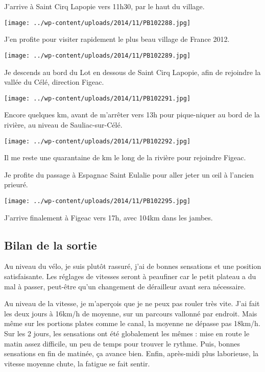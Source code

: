 J'arrive à Saint Cirq Lapopie vers 11h30, par le haut du village.
\begin{center} \texttt{[image: ../wp-content/uploads/2014/11/PB102288.jpg]} \end{center}

 J'en profite pour visiter rapidement le plus beau village de France 2012.
\begin{center} \texttt{[image: ../wp-content/uploads/2014/11/PB102289.jpg]} \end{center}
\vspace{-\topsep}

\pagebreak
 Je descends au bord du Lot en dessous de Saint Cirq Lapopie, afin de rejoindre la vallée du Célé, direction Figeac.
\begin{center} \texttt{[image: ../wp-content/uploads/2014/11/PB102291.jpg]} \end{center}

 Encore quelques km, avant de m'arrêter vers 13h pour pique-niquer au bord de la rivière, au niveau de Sauliac-sur-Célé.
\begin{center} \texttt{[image: ../wp-content/uploads/2014/11/PB102292.jpg]} \end{center}

 Il me reste une quarantaine de km le long de la rivière pour rejoindre Figeac.
 
 Je profite du passage à Espagnac Saint Eulalie pour aller jeter un œil à l'ancien prieuré.
\begin{center} \texttt{[image: ../wp-content/uploads/2014/11/PB102295.jpg]} \end{center}

 J'arrive finalement à Figeac vers 17h, avec 104km dans les jambes.
 
\subsection*{Bilan de la sortie}

 Au niveau du vélo, je suis plutôt rassuré, j'ai de bonnes sensations et une position satisfaisante. Les réglages de vitesses seront à peaufiner car le petit plateau a du mal à passer, peut-être qu'un changement de dérailleur avant sera nécessaire.

 Au niveau de la vitesse, je m'aperçois que je ne peux pas rouler très vite. J'ai fait les deux jours à 16km/h de moyenne, sur un parcours vallonné par endroit. Mais même sur les portions plates comme le canal, la moyenne ne dépasse pas 18km/h. Sur les 2 jours, les sensations ont été globalement les mêmes : mise en route le matin assez difficile, un peu de temps pour trouver le rythme. Puis, bonnes sensations en fin de matinée, ça avance bien. Enfin, après-midi plus laborieuse, la vitesse moyenne chute, la fatigue se fait sentir.

